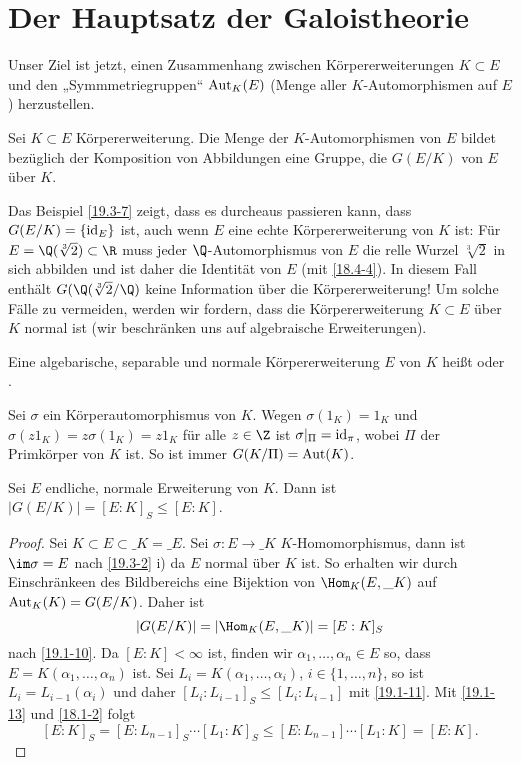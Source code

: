 \section{Der Hauptsatz der Galoistheorie}


Unser Ziel ist jetzt, einen Zusammenhang zwischen Körpererweiterungen $K \subset E$ und den „Symmmetriegruppen“ $\operatorname{Aut}_K(E)$ (Menge aller $K$-Automorphismen auf $E$) herzustellen.

\begin{df} \label{19.4-1}
	Sei $K \subset E$ Körpererweiterung.
	Die Menge der $K$-Automorphismen von $E$ bildet bezüglich der Komposition von Abbildungen eine Gruppe, die  $G(E/K)$ von $E$ über $K$.
\end{df}

Das Beispiel \ref{19.3-7} zeigt, dass es durcheaus passieren kann, dass $G(E/K) = \{ \operatorname{id}_E \}$ ist, auch wenn $E$ eine echte Körpererweiterung von $K$ ist:
Für $E = \Q(\sqrt[3]{2}) \subset \R$ muss jeder $\Q$-Automorphismus von $E$ die relle Wurzel $\sqrt[3]{2}$ in sich abbilden und ist daher die Identität von $E$ (mit \ref{18.4-4}).
In diesem Fall enthält $G(\Q(\sqrt[3]{2}/\Q)$ keine Information über die Körpererweiterung!
Um solche Fälle zu vermeiden, werden wir fordern, dass die Körpererweiterung $K \subset E$ über $K$ normal ist (wir beschränken uns auf algebraische Erweiterungen).

\begin{df} \label{19.4-2}
	Eine algebarische, separable und normale Körpererweiterung $E$ von $K$ heißt  oder .
\end{df}

\begin{nt} \label{19.4-3}
	Sei $\sigma$ ein Körperautomorphismus von $K$.
	Wegen $\sigma(1_K) = 1_K$ und $\sigma(z 1_K) = z \sigma(1_K) = z 1_K$ für alle $z \in \Z$ ist $\sigma|_\Pi = \operatorname{id}_\pi$, wobei $\Pi$ der Primkörper von $K$ ist.
	So ist immer $G(K / \Pi) = \operatorname{Aut}(K)$.
\end{nt}

\begin{st} \label{19.4-4}
	Sei $E$ endliche, normale Erweiterung von $K$.
	Dann ist $|G(E/K)| = [E:K]_S \le [E:K]$.
	\begin{proof}
		Sei $K \subset E \subset \_K = \_E$.
		Sei $\sigma: E \to \_K$ $K$-Homomorphismus, dann ist $\im \sigma = E$ nach \ref{19.3-2} i) da $E$ normal über $K$ ist.
		So erhalten wir durch Einschränkeen des Bildbereichs eine Bijektion von $\Hom_K(E, \_K)$ auf $\operatorname{Aut}_K(K) = G(E/K)$.
		Daher ist
		\[
			|G(E / K)| = | \Hom_K(E, \_K)| = [E : K]_S
		\]
		nach \ref{19.1-10}.
		Da $[E : K] < \infty$ ist, finden wir $\alpha_1, \dotsc, \alpha_n \in E$ so, dass $E = K(\alpha_1, \dotsc, \alpha_n)$ ist.
		Sei $L_i = K(\alpha_1, \dotsc, \alpha_i)$, $i \in \{1, \dotsc, n\}$, so ist $L_i = L_{i-1}(\alpha_i)$ und daher $[L_i : L_{i-1}]_S \le [L_i : L_{i-1}]$ mit \ref{19.1-11}.
		Mit \ref{19.1-13} und \ref{18.1-2} folgt
		\[
			[E:K]_S = [E : L_{n-1}]_S \dotsb [L_1 : K]_S
			\le [E : L_{n-1}] \dotsb [L_1 : K]
			= [E : K].
		\]
	\end{proof}
\end{st}

